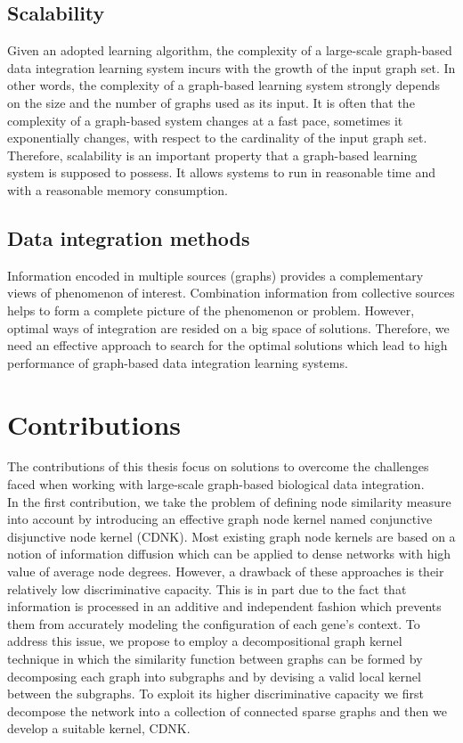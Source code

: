 \subsection{Scalability}
Given an adopted learning algorithm, the complexity of a large-scale graph-based data integration learning system incurs with the growth of the input graph set. In other words, the complexity of a graph-based learning system strongly depends on the size and the number of graphs used as its input. It is often that the complexity of a graph-based system changes at a fast pace, sometimes it exponentially changes, with respect to the cardinality of the input graph set. Therefore, scalability is an important property that a graph-based learning system is supposed to possess. It allows systems to run in reasonable time and with a reasonable memory consumption.
\subsection{Data integration methods}
Information encoded in multiple sources (graphs) provides a complementary views of phenomenon of interest. Combination information from collective sources helps to form a complete picture of the phenomenon or problem. However, optimal ways of integration are resided on a big space of solutions. Therefore, we need an effective approach to search for the optimal solutions which lead to high performance of graph-based data integration learning systems.
\section{Contributions}
The contributions of this thesis focus on solutions to overcome the challenges faced when working with large-scale graph-based biological data integration.\\

In the first contribution, we take the problem of defining node similarity measure into account by introducing an effective graph node kernel named conjunctive disjunctive node kernel (CDNK). Most existing graph node kernels are based on a notion of information diffusion which can be applied to dense
networks with high value of average node degrees. However, a drawback of these approaches is their relatively low discriminative capacity. This is in part due to the fact that information is processed in an additive and independent fashion which prevents them from accurately modeling the configuration of each gene’s context. To address this issue, we propose to employ a decompositional graph kernel technique in which the similarity function between graphs can be
formed by decomposing each graph into subgraphs and by devising a valid local
kernel between the subgraphs. To exploit its higher discriminative capacity we
first decompose the network into a collection of connected sparse graphs and then we develop a suitable kernel, CDNK.\\


